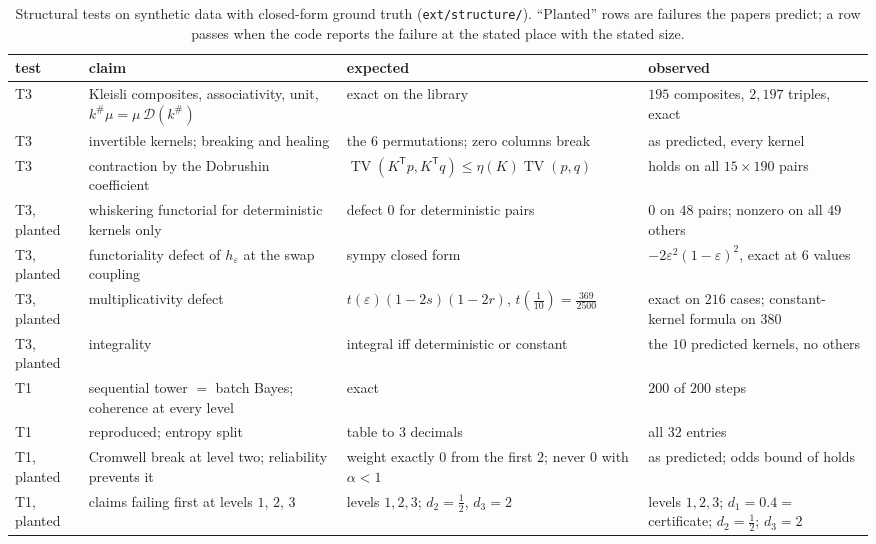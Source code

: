 \documentclass[11pt]{article}
\theoremstyle{definition}
\theoremstyle{remark}
\newcommand{\TV}{\operatorname{TV}}
\begin{document}
\begin{table}[!htbp]
\centering\footnotesize
\caption{Structural tests on synthetic data with closed-form ground truth (\texttt{ext/structure/}). ``Planted'' rows are failures the
papers predict; a row passes when the code reports the failure at the stated place with the stated size.}\label{tab:structure}
\setlength{\tabcolsep}{3pt}
\begin{tabular}{>{\raggedright}p{1.25cm}>{\raggedright}p{4.5cm}>{\raggedright}p{4.1cm}>{\raggedright\arraybackslash}p{4.2cm}}
\toprule
test & claim & expected & observed\\
\midrule
T3 & Kleisli composites, associativity, unit, $k^\#\mu=\mu\,\mathcal D(k^\#)$ & exact on the library & $195$ composites, $2{,}197$ triples, exact\\
T3 & invertible kernels; breaking and healing \cite[Props.~5.1, 6.4]{Bands} & the $6$ permutations; zero columns break & as predicted, every kernel\\
T3 & contraction by the Dobrushin coefficient & $\TV(K^{\mathsf T} p,K^{\mathsf T} q)\le\eta(K)\TV(p,q)$ & holds on all $15\times190$ pairs\\
T3, planted & whiskering functorial for deterministic kernels only \cite[Thm.~10.2]{Conditionals} & defect $0$ for deterministic pairs & $0$ on $48$ pairs; nonzero on all $49$ others\\
T3, planted & functoriality defect of $h_\varepsilon$ at the swap coupling & sympy closed form & $-2\varepsilon^2(1-\varepsilon)^2$, exact at $6$ values\\
T3, planted & multiplicativity defect \cite[Prop.~6.6]{Bands} & $t(\varepsilon)(1-2s)(1-2r)$, $t(\tfrac1{10})=\tfrac{369}{2500}$ & exact on $216$ cases; constant-kernel formula on $380$\\
T3, planted & integrality \cite[Thm.~6.1]{Bridges} & integral iff deterministic or constant & the $10$ predicted kernels, no others\\
T1 & sequential tower $=$ batch Bayes; coherence at every level & exact & $200$ of $200$ steps\\
T1 & \cite[Ex.~9.1]{Bands} reproduced; entropy split & table to $3$ decimals & all $32$ entries\\
T1, planted & Cromwell break at level two; reliability prevents it & weight exactly $0$ from the first $2$; never $0$ with $\alpha<1$ & as predicted; odds bound of \cite[Prop.~9.2]{Bands} holds\\
T1, planted & claims failing first at levels $1$, $2$, $3$ \cite[Thm.~10.5]{Tower} & levels $1,2,3$; $d_2=\tfrac12$, $d_3=2$ & levels $1,2,3$; $d_1=0.4=$ certificate; $d_2=\tfrac12$; $d_3=2$\\

\end{tabular}
\end{table}
\end{document}
